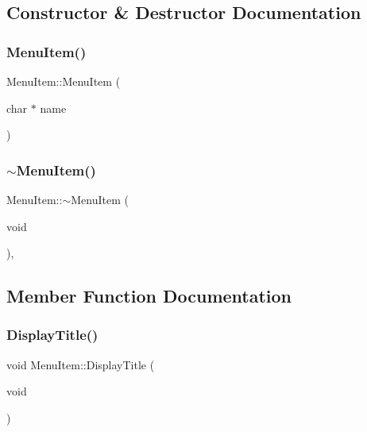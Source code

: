 \subsection{Constructor \& Destructor Documentation}
\mbox{\label{class_menu_item_aa966696433faf0de75908d9789025f1f}} 
\subsubsection{\texorpdfstring{Menu\+Item()}{MenuItem()}}
{\footnotesize\ttfamily Menu\+Item\+::\+Menu\+Item (\begin{DoxyParamCaption}\item[{char $\ast$}]{name }\end{DoxyParamCaption})\hspace{0.3cm}{\ttfamily [protected]}}

\mbox{\label{class_menu_item_a75a72b552ba092d7f0d24081648f5912}} 
\subsubsection{\texorpdfstring{$\sim$\+Menu\+Item()}{~MenuItem()}}
{\footnotesize\ttfamily Menu\+Item\+::$\sim$\+Menu\+Item (\begin{DoxyParamCaption}\item[{void}]{ }\end{DoxyParamCaption})\hspace{0.3cm}{\ttfamily [protected]}, {\ttfamily [virtual]}}



\subsection{Member Function Documentation}
\mbox{\label{class_menu_item_adbd2e567da57274ed67ed261a93fde56}} 
\subsubsection{\texorpdfstring{Display\+Title()}{DisplayTitle()}}
{\footnotesize\ttfamily void Menu\+Item\+::\+Display\+Title (\begin{DoxyParamCaption}\item[{void}]{ }\end{DoxyParamCaption})\hspace{0.3cm}{\ttfamily [protected]}}

